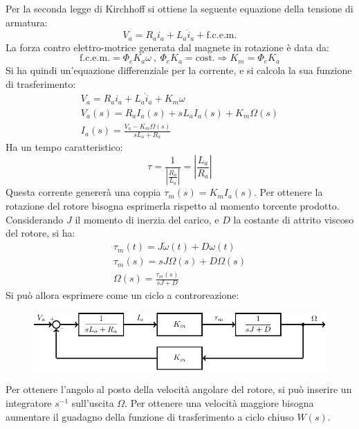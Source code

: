 \documentclass{article}
\numberwithin{equation}{subsection}
\begin{document}
Per la seconda legge di Kirchhoff si ottiene la seguente equazione della tensione di armatura:
\begin{equation*}
    V_a=R_ai_a+L_a\dot i_a+\mathrm{f.c.e.m.} 
\end{equation*}
La forza contro elettro-motrice generata dal magnete in rotazione è data da:
\begin{equation*}
    \mathrm{f.c.e.m.}=\Phi_eK_a\omega\:,\:\Phi_eK_a=\mathrm{cost.}\Rightarrow K_m=\Phi_eK_a
\end{equation*}
Si ha quindi un'equazione differenziale per la corrente, e si calcola la sua funzione di trasferimento:
\begin{gather*}
    V_a=R_ai_a+L_a\dot i_a+K_m\omega\\
    V_a(s)=R_aI_a(s)+sL_aI_a(s)+K_m\Omega(s)\\
    I_a(s)=\displaystyle\frac{V_a-K_m\Omega(s)}{sL_a+R_a}
\end{gather*}
Ha un tempo caratteristico:
\begin{equation*}
    \tau=\displaystyle\frac{1}{\displaystyle\left|\frac{R_a}{L_a}\right|}=\left|\frac{L_a}{R_a}\right|
\end{equation*}
Questa corrente genererà una coppia $\tau_m(s)=K_mI_a(s)$. 
Per ottenere la rotazione del rotore bisogna esprimerla rispetto al momento torcente prodotto. Considerando $J$ il momento di inerzia del carico, e $D$ la costante 
di attrito viscoso del rotore, si ha:
\begin{gather*}
    \tau_m(t)=J\dot\omega(t)+D\omega(t)\\
    \tau_m(s)=sJ\Omega(s)+D\Omega(s)\\
    \Omega(s)=\displaystyle\frac{\tau_m(s)}{sJ+D}
\end{gather*}
Si può allora esprimere come un ciclo a controreazione:

\begin{figure}[H]%
    \centering
    \includegraphics{motore-continua.pdf}%
\end{figure}

Per ottenere l'angolo al posto della velocità angolare del rotore, si può inserire un integratore $s^{-1}$ sull'uscita $\Omega$. Per ottenere una velocità 
maggiore bisogna aumentare il guadagno della funzione di trasferimento a ciclo chiuso $W(s)$. 
\end{document}
